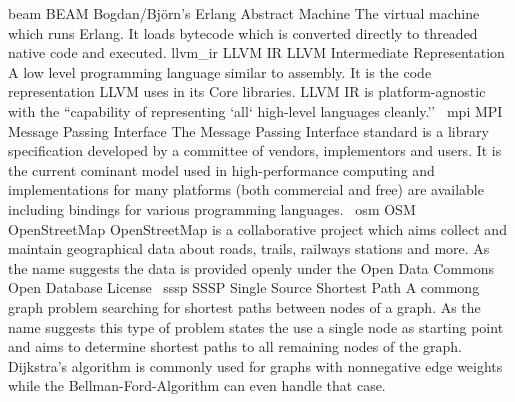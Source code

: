 

\newdualentry
{beam}
{BEAM}
{Bogdan/Bj\"orn's Erlang Abstract Machine}
{The virtual machine which runs Erlang. It loads bytecode which is converted directly to threaded native code and executed.}
\newdualentry
{llvm_ir}
{LLVM IR}
{LLVM Intermediate Representation}
{A low level programming language similar to assembly. It is the code representation LLVM uses in its Core libraries. LLVM IR is platform-agnostic with the ``capability of representing `all` high-level languages cleanly.''~\cite{llvm_ir_ref}}
\newdualentry
{mpi}
{MPI}
{Message Passing Interface}
{The Message Passing Interface standard is a library specification developed by a committee of vendors, implementors and users. It is the current cominant model used in high-performance computing and implementations for many platforms (both commercial and free) are available including bindings for various programming languages.~\cite{mpi_main, mpi_infiniband}}
\newdualentry
{osm}
{OSM}
{OpenStreetMap}
{OpenStreetMap is a collaborative project which aims collect and maintain geographical data about roads, trails, railways stations and more. As the name suggests the data is provided openly under the Open Data Commons Open Database License~}
\newdualentry
{sssp}
{SSSP}
{Single Source Shortest Path}
{A commong graph problem searching for shortest paths between nodes of a graph. As the name suggests this type of problem states the use a single node as starting point and aims to determine shortest paths to all remaining nodes of the graph. Dijkstra's algorithm is commonly used for graphs with nonnegative edge weights while the Bellman-Ford-Algorithm can even handle that case.}
